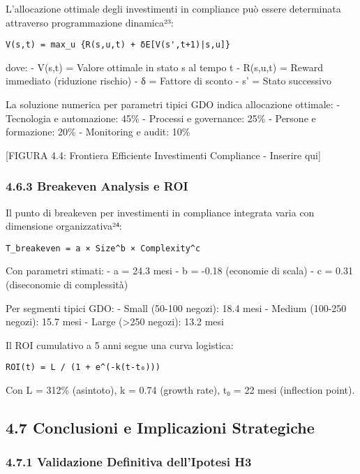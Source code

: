 \documentclass{report}
\begin{document}
L'allocazione ottimale degli investimenti in compliance può essere
determinata attraverso programmazione dinamica²³:

\begin{verbatim}
V(s,t) = max_u {R(s,u,t) + δE[V(s',t+1)|s,u]}
\end{verbatim}

dove: - V(s,t) = Valore ottimale in stato s al tempo t - R(s,u,t) =
Reward immediato (riduzione rischio) - δ = Fattore di sconto - s' =
Stato successivo

La soluzione numerica per parametri tipici GDO indica allocazione
ottimale: - Tecnologia e automazione: 45\% - Processi e governance: 25\%
- Persone e formazione: 20\% - Monitoring e audit: 10\%

{[}FIGURA 4.4: Frontiera Efficiente Investimenti Compliance - Inserire
qui{]}

\subsubsection{4.6.3 Breakeven Analysis e
ROI}\label{breakeven-analysis-e-roi}

Il punto di breakeven per investimenti in compliance integrata varia con
dimensione organizzativa²⁴:

\begin{verbatim}
T_breakeven = a × Size^b × Complexity^c
\end{verbatim}

Con parametri stimati: - a = 24.3 mesi - b = -0.18 (economie di scala) -
c = 0.31 (diseconomie di complessità)

Per segmenti tipici GDO: - Small (50-100 negozi): 18.4 mesi - Medium
(100-250 negozi): 15.7 mesi - Large (\textgreater250 negozi): 13.2 mesi

Il ROI cumulativo a 5 anni segue una curva logistica:

\begin{verbatim}
ROI(t) = L / (1 + e^(-k(t-t₀)))
\end{verbatim}

Con L = 312\% (asintoto), k = 0.74 (growth rate), t₀ = 22 mesi
(inflection point).

\subsection{4.7 Conclusioni e Implicazioni
Strategiche}\label{conclusioni-e-implicazioni-strategiche}

\subsubsection{4.7.1 Validazione Definitiva dell'Ipotesi
H3}\label{validazione-definitiva-dellipotesi-h3}
\end{document}
